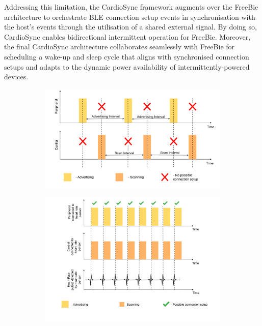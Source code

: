 \noindent Addressing this limitation, the CardioSync framework augments over the FreeBie architecture to orchestrate BLE connection setup events in synchronisation with the host's events through the utilisation of a shared external signal. By doing so, CardioSync enables bidirectional intermittent operation for FreeBie. Moreover, the final CardioSync architecture collaborates seamlessly with FreeBie for scheduling a wake-up and sleep cycle that aligns with synchronised connection setups and adapts to the dynamic power availability of intermittently-powered devices.
\vspace{3\baselineskip}
\begin{figure}[t]
    \begin{subfigure}{1\linewidth}
        \centering
        \includegraphics[width=\linewidth]{chapters/Architecture/Freebie_concept.pdf}
        \label{fig:concept_freebie}
        \vspace{3\baselineskip}
    \end{subfigure}
    \begin{subfigure}{1\linewidth}
        \centering
        \includegraphics[width=\linewidth]{chapters/Architecture/CardioSync_concept.pdf}

\end{subfigure}
\end{figure}
